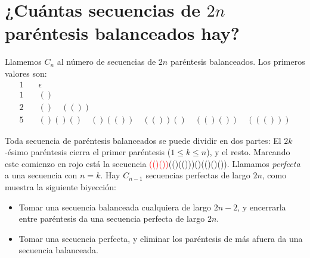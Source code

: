 \section[¿Cuántas secuencias
	   de \texorpdfstring{$2 n$ }{}paréntesis balanceados hay?]
	{\protect\boldmath
	   ¿Cuántas secuencias
	   de \texorpdfstring{$2 n$ }{}paréntesis balanceados
	   hay?%
       \protect\unboldmath}
\label{sec:Catalan}

  Llamemos \(C_n\)
  al número de secuencias
  de \(2 n\) paréntesis balanceados.
  Los primeros valores son:
  \begin{align*}
    1 & \quad \epsilon \\
    1 & \quad () \\
    2 & \quad () \quad (()) \\
    5 & \quad ()()() \quad ()(()) \quad (())() \quad (()()) \quad ((()))
  \end{align*}

  Toda secuencia
  de paréntesis balanceados se puede dividir en dos partes:
  El \(2 k\)\nobreakdash-ésimo paréntesis
  cierra el primer paréntesis (\(1 \le k \le n\)),
  y el resto.
  Marcando este comienzo en rojo
  está la secuencia
  \textcolor{red}{(()())}(()(()))()(()()()).
  Llamamos \emph{perfecta} a una secuencia
  con \(n = k\).
  Hay \(C_{n - 1}\) secuencias perfectas
  de largo \(2 n\),
  como muestra la siguiente biyección:
  \begin{itemize}
  \item
    Tomar una secuencia balanceada cualquiera
    de largo \(2 n - 2\),
    y encerrarla entre paréntesis
    da una secuencia perfecta de largo \(2 n\).
  \item
    Tomar una secuencia perfecta,
    y eliminar los paréntesis de más afuera
    da una secuencia balanceada.
  \end{itemize}

